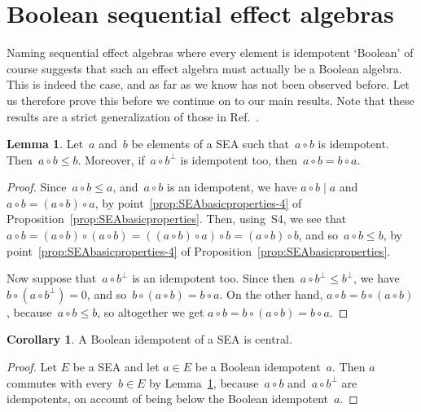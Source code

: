 \documentclass[a4paper, onecolumn, accepted=2020-12-22]{quantumarticle}
\newcommand{\mult}{\mathop{\circ}}
\newcommand{\commu}{\mathrel{\lvert}}
\newcounter{counter}
\theoremstyle{definition}
\newtheorem{proposition}[counter]{Proposition}
\newtheorem{lemma}[counter]{Lemma}
\newtheorem{corollary}[counter]{Corollary}
\begin{document}
\section{Boolean sequential effect algebras}\label{sec:boolean}
Naming sequential effect algebras where every element is idempotent `Boolean' of course suggests that such an effect algebra must actually be a Boolean algebra. This is indeed the case, and as far as we know has not been observed before. Let us therefore prove this before we continue on to our main results. Note that these results are a strict generalization of those in Ref.~\cite{tkadlec2008atomic}.

\begin{lemma}
\label{lem:amultbidempotent}
Let~$a$ and~$b$ be elements of a SEA such that~$a\mult b$ is idempotent.
Then~$a\mult b \leq b$.
Moreover,
if~$a\mult b^\perp$ is idempotent too,
then~$a\mult b = b \mult a$.
\end{lemma}
\begin{proof}
Since~$a\mult b\leq a$,
and~$a\mult b$ is an idempotent,
we have $a\mult b \commu a$
and $a\mult b = (a\mult b) \mult a$,
by 
point~\ref{prop:SEAbasicproperties-4} of
Proposition~\ref{prop:SEAbasicproperties}.
Then, using~S4, we see that
    $a\mult b = (a\mult b)\mult (a\mult b)
    = ((a\mult b)\mult a)\mult b
    = (a\mult b) \mult b$,
    and so~$a\mult b\leq b$,
    by point~\ref{prop:SEAbasicproperties-4} of
Proposition~\ref{prop:SEAbasicproperties}.

Now suppose that~$a\mult b^\perp$ is an idempotent too.
    Since then~$a\mult b^\perp \leq b^\perp$,
    we have $b\mult (a\mult b^\perp)=0$,
    and so~$b \mult (a\mult b)= b\mult a$.
On the other hand, $a\mult b = b\mult (a\mult b)$,
because~$a\mult b\leq b$,
so altogether we get $a\mult b = b\mult (a \mult b) = b\mult a$.
\end{proof}
\begin{corollary}
\label{cor:booleans-central}
A Boolean idempotent of a SEA is central.
\end{corollary}
\begin{proof}
Let $E$ be a SEA and let $a\in E$
be a Boolean idempotent~$a$.
Then $a$ commutes with every~$b\in E$
    by Lemma~\ref{lem:amultbidempotent},
    because~$a\mult b$ and~$a\mult b^\perp$
    are idempotents,
    on account of being
     below the Boolean idempotent~$a$.
\end{proof}
\end{document}
